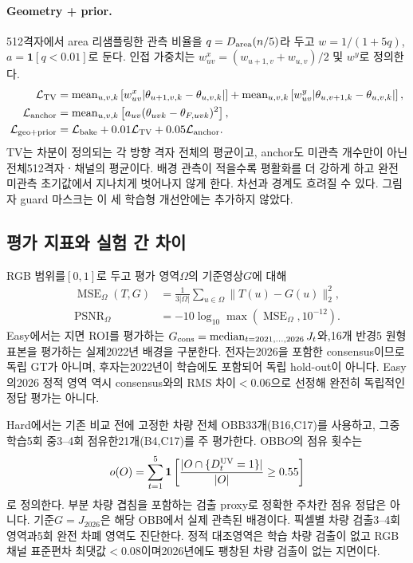 \documentclass[11pt,a4paper]{article}
\newcommand{\ind}{\mathbf{1}}
\newcommand{\med}{\operatorname{median}}
\newcommand{\mean}{\operatorname{mean}}
\begin{document}
\paragraph{Geometry + prior.}
512격자에서 area 리샘플링한 관측 비율을 $q=D_{\rm area}(n/5)$라 두고 $w=1/(1+5q)$, $a=\ind[q<0.01]$로 둔다. 인접 가중치는 $w^x_{uv}=(w_{u+1,v}+w_{u,v})/2$ 및 $w^y$로 정의한다.
\begin{align}
 \mathcal L_{\rm TV}
 &=\mean_{u,v,k}\left[w^x_{uv}|\theta_{u+1,v,k}-\theta_{u,v,k}|\right]
   +\mean_{u,v,k}\left[w^y_{uv}|\theta_{u,v+1,k}-\theta_{u,v,k}|\right],\\
 \mathcal L_{\rm anchor}
 &=\mean_{u,v,k}\left[a_{uv}(\theta_{uvk}-\theta_{F,uvk})^2\right],\\
 \mathcal L_{\rm geo+prior}
 &=\mathcal L_{\rm bake}+0.01\mathcal L_{\rm TV}+0.05\mathcal L_{\rm anchor}.
\end{align}
TV는 차분이 정의되는 각 방향 격자 전체의 평균이고, anchor도 미관측 개수만이 아닌 전체512격자ㆍ채널의 평균이다. 배경 관측이 적을수록 평활화를 더 강하게 하고 완전 미관측 초기값에서 지나치게 벗어나지 않게 한다. 차선과 경계도 흐려질 수 있다. 그림자 guard 마스크는 이 세 학습형 개선안에는 추가하지 않았다.

\subsection{평가 지표와 실험 간 차이}
RGB 범위를$[0,1]$로 두고 평가 영역$\Omega$의 기준영상$G$에 대해
\begin{align}
 \operatorname{MSE}_{\Omega}(T,G)&=\frac1{3|\Omega|}\sum_{u\in\Omega}\|T(u)-G(u)\|_2^2,\\
 \operatorname{PSNR}_{\Omega}&=-10\log_{10}\max(\operatorname{MSE}_{\Omega},10^{-12}).
\end{align}
Easy에서는 지면 ROI를 평가하는 $G_{\rm cons}=\med_{t=2021,\ldots,2026}J_t$와,16개 반경5 원형 표본을 평가하는 실제2022년 배경을 구분한다. 전자는2026을 포함한 consensus이므로 독립 GT가 아니며, 후자는2022년이 학습에도 포함되어 독립 hold-out이 아니다. Easy의2026 정적 영역 역시 consensus와의 RMS 차이$<0.06$으로 선정해 완전히 독립적인 정답 평가는 아니다.

Hard에서는 기존 비교 전에 고정한 차량 전체 OBB33개(B16,C17)를 사용하고, 그중 학습5회 중3--4회 점유한21개(B4,C17)를 주 평가한다. OBB$O$의 점유 횟수는
\begin{equation}
 o(O)=\sum_{t=1}^5\ind\left[\frac{|O\cap\{D_t^{\rm UV}=1\}|}{|O|}\ge0.55\right]
\end{equation}
로 정의한다. 부분 차량 겹침을 포함하는 검출 proxy로 정확한 주차칸 점유 정답은 아니다. 기준$G=J_{2026}$은 해당 OBB에서 실제 관측된 배경이다. 픽셀별 차량 검출3--4회 영역과5회 완전 차폐 영역도 진단한다. 정적 대조영역은 학습 차량 검출이 없고 RGB 채널 표준편차 최댓값$<0.08$이며2026년에도 팽창된 차량 검출이 없는 지면이다.
\end{document}
